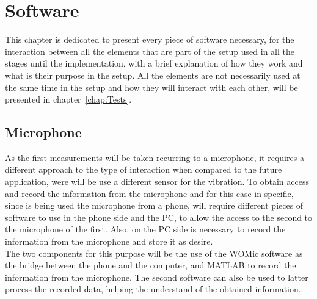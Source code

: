 \cleardoublepage
\chapter{Software}\label{chap:software}
This chapter is dedicated to present every piece of software necessary, for the interaction between all the elements that are part of the setup used in all the stages until the implementation, with a brief explanation of how they work and what is their purpose in the setup. All the elements are not necessarily used at the same time in the setup and how they will interact with each other, will be presented in chapter~\ref{chap:Tests}.
\section{Microphone}
As the first measurements will be taken recurring to a microphone, it requires a different approach to the type of interaction when compared to the future application, were will be use a different sensor for the vibration. To obtain access and record the information from the microphone and for this case in specific, since is being used the microphone from a phone, will require different pieces of software to use in the phone side and the PC, to allow the access to the second to the microphone of the first. Also, on the PC side is necessary to record the information from the microphone and store it as desire.\\
The two components for this purpose will be the use of the WOMic software as the bridge between the phone and the computer, and MATLAB to record the information from the microphone. The second software can also be used to latter process the recorded data, helping the understand of the obtained information. 
